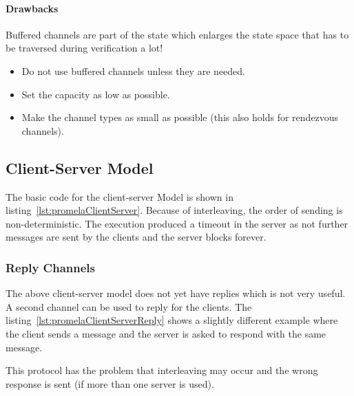 				\paragraph{Drawbacks}
					Buffered channels are part of the state which enlarges the state space that has to be traversed during verification a lot!
					
					\begin{itemize}
						\item Do not use buffered channels unless they are needed.
						\item Set the capacity as low as possible.
						\item Make the channel types as small as possible (this also holds for rendezvous channels).
					\end{itemize}

		\subsection{Client-Server Model}
			
		
			The basic code for the client-server Model is shown in listing~\ref{lst:promelaClientServer}. Because of interleaving, the order of sending is non-deterministic. The execution
			produced a timeout in the server as not further messages are sent by the clients and the server blocks forever.

			\subsubsection{Reply Channels}
				
			
				The above client-server model does not yet have replies which is not very useful. A second channel can be used to reply for the clients. The listing~\ref{lst:promelaClientServerReply} shows a slightly different example where the client sends a message and the server is asked to respond with the same message.
				
				This protocol has the problem that interleaving may occur and the wrong response is sent (if more than one server is used).

